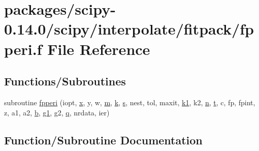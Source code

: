 \hypertarget{fpperi_8f}{}\section{packages/scipy-\/0.14.0/scipy/interpolate/fitpack/fpperi.f File Reference}
\label{fpperi_8f}
\subsection*{Functions/\+Subroutines}
\begin{DoxyCompactItemize}
\item 
subroutine \hyperlink{fpperi_8f_a87aab954ee528394b78e43fa9225858f}{fpperi} (iopt, \hyperlink{vecnorm1_8cc_ac73eed9e41ec09d58f112f06c2d6cb63}{x}, y, w, \hyperlink{indexexpr_8h_ab72fdb4031d47b75ab26dd18a437bcdc}{m}, \hyperlink{indexexpr_8h_abb72938a198351550846b37a84588b63}{k}, \hyperlink{indexexpr_8h_ae024b0db549122b44c349ae28ec990dc}{s}, nest, tol, maxit, \hyperlink{cephes_8h_aea4a28d7f448efcb4713416bd1f3cf49}{k1}, k2, \hyperlink{indexexpr_8h_ab427e2e2b4d6cec55fa088ea2a692ace}{n}, \hyperlink{indexexpr_8h_a01709998b82be3f34e0412206618d09d}{t}, c, fp, fpint, z, a1, a2, \hyperlink{gen__mat5files_8m_a7b38767b3b6a8dae167e5afa4fc340b0}{b}, \hyperlink{nnls_8f_a676cb7f0d762601224efd1660ce09789}{g1}, g2, \hyperlink{indexexpr_8h_ac886c3584e464b5533390d7440c9dd98}{q}, nrdata, ier)
\end{DoxyCompactItemize}


\subsection{Function/\+Subroutine Documentation}
\hypertarget{fpperi_8f_a87aab954ee528394b78e43fa9225858f}{}

